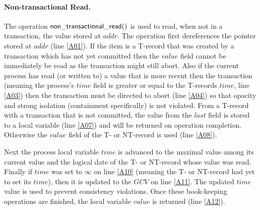 \paragraph{Non-transactional Read.}
The   operation  ${\sf   non\_transactional\_read()}$  is   used   to  read,
when not in a transaction, the value stored at
$\mathit{addr}$.
The  operation first  dereferences  the pointer  stored at  $\mathit{addr}$
(line \ref{A01}).
If the item is a T-record that was created by a 
transaction which  has not yet  committed then the $\mathit{value}$ field
cannot be immediately be read as the transaction might still abort.
Also if the current process has read (or written to) a value that is more recent then the transaction
(meaning the process's $\mathit{time}$ field is greater or equal to the T-records
$\mathit{time}$, line \ref{A03}) then the transaction must be directed to abort (line \ref{A04})
so that opacity and strong isolation (containment specifically) is not violated.
From a T-record with a transaction that is not committed, the value from the $\mathit{last}$
field is stored to a local variable (line \ref{A07}) and will be returned on operation completion.
Otherwise the $\mathit{value}$ field of the T- or NT-record is used (line \ref{A08}).


Next the process local variable $\mathit{time}$ is advanced to 
the maximal 
value among its current 
value and the logical date of the T- or NT-record whose value was read.
Finally if $\mathit{time}$ was set to $\infty$ on line \ref{A10}
(meaning the T- or NT-record had yet to set its $\mathit{time}$), then it is updated
to the $\mathit{GCV}$ on line \ref{A11}.
The updated  $\mathit{time}$
value is used 
to prevent consistency 
violations. %
Once these book-keeping 
operations are finished, the local variable $\mathit{value}$
is returned (line \ref{A12}).

